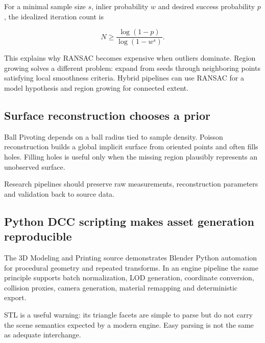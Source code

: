 \hypertarget{04-visual-computing-ii-ch035-ransac-separates-model-evidence-from-outliers}{}

For a minimal sample size \(s\), inlier probability \(w\) and desired success probability \(p\), the idealized iteration count is

\[
N\ge \frac{\log(1-p)}{\log(1-w^s)}.
\]

This explains why RANSAC becomes expensive when outliers dominate. Region growing solves a different problem: expand from seeds through neighboring points satisfying local smoothness criteria. Hybrid pipelines can use RANSAC for a model hypothesis and region growing for connected extent.

\subsection{Surface reconstruction chooses a prior}\label{04-visual-computing-ii-ch035-surface-reconstruction-chooses-a-prior}

\hypertarget{04-visual-computing-ii-ch035-surface-reconstruction-chooses-a-prior}{}

Ball Pivoting depends on a ball radius tied to sample density. Poisson reconstruction builds a global implicit surface from oriented points and often fills holes. Filling holes is useful only when the missing region plausibly represents an unobserved surface.

Research pipelines should preserve raw measurements, reconstruction parameters and validation back to source data.

\subsection{Python DCC scripting makes asset generation reproducible}\label{04-visual-computing-ii-ch035-python-dcc-scripting-makes-asset-generation-reproducible}

\hypertarget{04-visual-computing-ii-ch035-python-dcc-scripting-makes-asset-generation-reproducible}{}

The 3D Modeling and Printing source demonstrates Blender Python automation for procedural geometry and repeated transforms. In an engine pipeline the same principle supports batch normalization, LOD generation, coordinate conversion, collision proxies, camera generation, material remapping and deterministic export.

STL is a useful warning: its triangle facets are simple to parse but do not carry the scene semantics expected by a modern engine. Easy parsing is not the same as adequate interchange.

